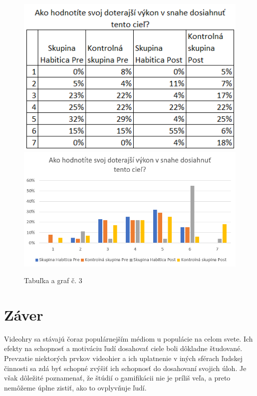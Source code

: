 \documentclass[10pt,twoside,slovak,a4paper]{article}
\begin{document}
\begin{figure}[h]
	\caption{Tabuľka a graf č. 3}
	\includegraphics[scale=0.7]{vykonTable.png}
	\includegraphics[scale=0.5]{vykon.png}
	\centering
\end{figure}


\section{Záver} \label{conclusion}
Videohry sa stávajú čoraz populárnejším médiom u populácie na celom svete. 
Ich efekty na schopnosť a motiváciu ľudí dosahovať ciele boli dôkladne študované. 
Prevzatie niektorých prvkov videohier a ich uplatnenie v iných sférach ľudskej 
činnosti sa zdá byť schopné zvýšiť ich schopnosť do dosahovaní svojich úloh. 
Je však dôležité poznamenať, že štúdií o gamifikácii nie je príliš veľa, a 
preto nemôžeme úplne zistiť, ako to ovplyvňuje ľudí.


\end{document}
